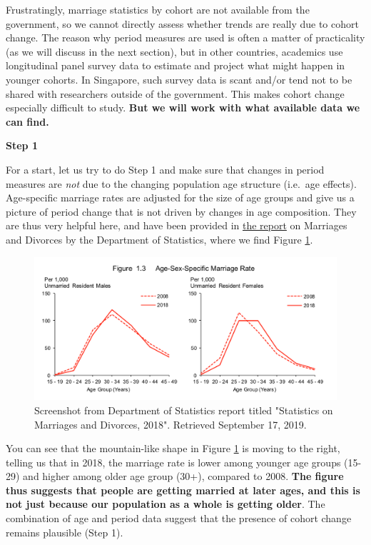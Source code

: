 \documentclass[
  openany]{book}
\begin{document}
Frustratingly, marriage statistics by cohort are not available from the government, so we cannot directly assess whether trends are really due to cohort change. The reason why period measures are used is often a matter of practicality (as we will discuss in the next section), but in other countries, academics use longitudinal panel survey data to estimate and project what might happen in younger cohorts. In Singapore, such survey data is scant and/or tend not to be shared with researchers outside of the government. This makes cohort change especially difficult to study. \textbf{But we will work with what available data we can find.}

\textbf{Step 1}

For a start, let us try to do Step 1 and make sure that changes in period measures are \emph{not} due to the changing population age structure (i.e.~age effects). Age-specific marriage rates are adjusted for the size of age groups and give us a picture of period change that is not driven by changes in age composition. They are thus very helpful here, and have been provided in \href{https://www.singstat.gov.sg/-/media/files/publications/population/smd2018.pdf}{the report} on Marriages and Divorces by the Department of Statistics, where we find Figure \ref{fig:apc-reportsingstat}.

\begin{figure}

{\centering \includegraphics[width=0.8\linewidth]{images/apc/report_fig} 

}

\caption{Screenshot from Department of Statistics report titled "Statistics on Marriages and Divorces,  2018". Retrieved September 17, 2019.}\label{fig:apc-reportsingstat}
\end{figure}

You can see that the mountain-like shape in Figure \ref{fig:apc-reportsingstat} is moving to the right, telling us that in 2018, the marriage rate is lower among younger age groups (15-29) and higher among older age group (30+), compared to 2008. \textbf{The figure thus suggests that people are getting married at later ages, and this is not just because our population as a whole is getting older}. The combination of age and period data suggest that the presence of cohort change remains plausible (Step 1).
\end{document}
